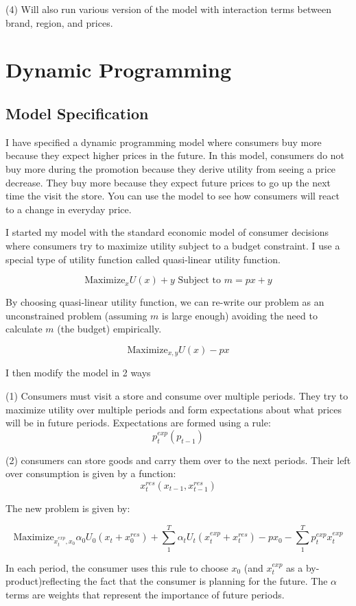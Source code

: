 \documentclass{article}
\begin{document}
(4) Will also run various version of the model with interaction terms between brand, region, and prices.

\section{Dynamic Programming}

\subsection{Model Specification}

I have specified a dynamic programming model where consumers buy more because they expect higher prices in the future. In this model, consumers do not buy more during the promotion because they derive utility from seeing a price decrease. They buy more because they expect future prices to go up the next time the visit the store. You can use the model to see how consumers will react to a change in everyday price.

I started my model with the standard economic model of consumer decisions where consumers try to maximize utility subject to a budget constraint. I use a special type of utility function called quasi-linear utility function.

$$\text{Maximize}_{x} U(x) + y  \text{ Subject to } m = px + y $$

By choosing quasi-linear utility function, we can re-write our problem as an unconstrained problem (assuming $m$ is large enough) avoiding the need to calculate $m$ (the budget) empirically. 

$$\text{Maximize}_{x,y} U(x) -px $$

I then modify the model in 2 ways

(1) Consumers must visit a store and consume over multiple periods. They try to maximize utility over multiple periods and form expectations about what prices will be in future periods. Expectations are formed using a rule: $$p^{exp}_t(p_{t-1})$$

(2) consumers can store goods and carry them over to the next periods. Their left over consumption is given by a function: $$x^{res}_t(x_{t-1},x^{res}_{t-1})$$

The new problem is given by:

$$ \text{Maximize}_{x^{exp}_t,x_0} \alpha_0 U_0(x_t +x^{res}_0) + \sum_1^T \alpha_t U_t(x^{exp}_t+x^{res}_{t}) - px_0 - \sum_1^T p^{exp}_t x^{exp}_t $$

In each period, the consumer uses this rule to choose $x_0$ (and $x^{exp}_t$ as a by-product)reflecting the fact that the consumer is planning for the future. The $\alpha$ terms are weights that represent the importance of future periods.
\end{document}
